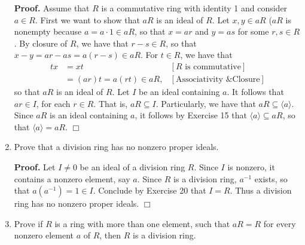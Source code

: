 \documentclass[9pt]{article}
\newcommand{\qed}{\hfill \ensuremath{\Box}}
\newcommand{\cyc}[1]{\langle #1 \rangle}
\begin{document}
\begin{enumerate}
      \textbf{Proof.} Assume that $R$ is a commutative ring with identity 1 and
      consider $a \in R$. First we want to show that $aR$ is an ideal of $R$.
      Let $x, y \in aR$ ($aR$ is nonempty because $a = a \cdot 1 \in aR$, so
      that $x = ar$ and $y = as$ for some $r, s \in R$. By closure of $R$, we
      have that $r - s \in R$, so that $x - y = ar - as = a(r - s) \in aR$. For
      $t \in R$, we have that
      \begin{align*}
         tx &= xt &[R \text{ is commutative}] \\
            &= (ar)t = a(rt) \in aR, &[\text{Associativity \& Closure}]
      \end{align*}
      so that $aR$ is an ideal of $R$. Let $I$ be an ideal containing $a$. It
      follows that $ar \in I$, for each $r \in R$. That is, $aR \subseteq I$.
      Particularly, we have that $aR \subseteq \cyc{a}$. Since $aR$ is an ideal
      containing $a$, it follows by Exercise 15 that $\cyc{a} \subseteq aR$, so
      that $\cyc{a} =aR$. \qed
   \item Prove that a division ring has no nonzero proper ideals.
         
      \textbf{Proof.} Let $I \neq 0$ be an ideal of a division ring $R$. Since
      $I$ is nonzero, it contains a nonzero element, say $a$. Since $R$ is a
      division ring, $a^{-1}$ exists, so that $a(a^{-1}) = 1 \in I$. Conclude by
      Exercise 20 that $I = R$. Thus a division ring has no nonzero proper
      ideals. \qed
   \item Prove if $R$ is a ring with more than one element, such that $aR = R$
         for every nonzero element $a$ of $R$, then $R$ is a division ring.
         

\end{enumerate}
\end{document}
